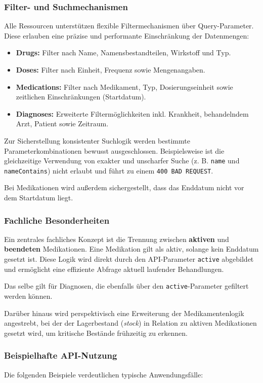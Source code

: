 \subsubsection{Filter- und Suchmechanismen}
Alle Ressourcen unterstützen flexible Filtermechanismen über Query-Parameter.
Diese erlauben eine präzise und performante Einschränkung der Datenmengen:

\begin{itemize}
\item \textbf{Drugs:} Filter nach Name, Namensbestandteilen, Wirkstoff und Typ.
\item \textbf{Doses:} Filter nach Einheit, Frequenz sowie Mengenangaben.
\item \textbf{Medications:} Filter nach Medikament, Typ, Dosierungseinheit sowie zeitlichen Einschränkungen (Startdatum).
\item \textbf{Diagnoses:} Erweiterte Filtermöglichkeiten inkl. Krankheit, behandelndem Arzt, Patient sowie Zeitraum.
\end{itemize}

Zur Sicherstellung konsistenter Suchlogik werden bestimmte Parameterkombinationen bewusst ausgeschlossen.
Beispielsweise ist die gleichzeitige Verwendung von exakter und unscharfer Suche (z. B. \texttt{name} und \texttt{nameContains}) nicht erlaubt und führt zu einem \texttt{400 BAD REQUEST}.

Bei Medikationen wird außerdem sichergestellt, dass das Enddatum nicht vor dem Startdatum liegt.

\subsubsection{Fachliche Besonderheiten}
Ein zentrales fachliches Konzept ist die Trennung zwischen \textbf{aktiven} und \textbf{beendeten} Medikationen.
Eine Medikation gilt als aktiv, solange kein Enddatum gesetzt ist.
Diese Logik wird direkt durch den API-Parameter \texttt{active} abgebildet und ermöglicht eine effiziente Abfrage aktuell laufender Behandlungen.

Das selbe gilt für Diagnosen, die ebenfalls über den \texttt{active}-Parameter gefiltert werden können.

Darüber hinaus wird perspektivisch eine Erweiterung der Medikamentenlogik angestrebt, bei der der Lagerbestand (\textit{stock}) in Relation zu aktiven Medikationen gesetzt wird, um kritische Bestände frühzeitig zu erkennen.

\subsubsection{Beispielhafte API-Nutzung}
Die folgenden Beispiele verdeutlichen typische Anwendungsfälle:

